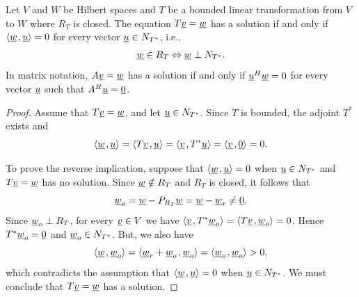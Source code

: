 \begin{theorem}
Let $V$ and $W$ be Hilbert spaces and $T$ be a bounded linear transformation from $V$ to $W$ where $R_T$ is closed.
The equation $T\underline{v} = \underline{w}$ has a solution if and only if ${\left\langle  \underline{w}  \mskip2mu ,  \underline{u}  \right\rangle} = 0$ for every vector $\underline{u} \in N_{T^*}$, i.e.,
\begin{equation*}
\underline{w} \in R_T \Leftrightarrow \underline{w} \perp N_{T^*} .
\end{equation*}
In matrix notation, $A \underline{v} = \underline{w}$ has a solution if and only if $\underline{u}^H \underline{w} = 0$ for every vector $\underline{u}$ such that $A^H \underline{u} = \underline{0}$.
\end{theorem}
\begin{proof}
Assume that $T \underline{v} = \underline{w}$, and let $\underline{u} \in N_{T^*}$.
Since $T$ is bounded, the adjoint $T^*$ exists and
\begin{equation*}
{\left\langle  \underline{w}  \mskip2mu ,  \underline{u}  \right\rangle}
= {\left\langle  T \underline{v}  \mskip2mu ,  \underline{u}  \right\rangle}
= {\left\langle  \underline{v}  \mskip2mu ,  T^* \underline{u}  \right\rangle}
= {\left\langle  \underline{v}  \mskip2mu ,  \underline{0}  \right\rangle}
= 0 .
\end{equation*}

To prove the reverse implication, suppose that ${\left\langle  \underline{w}  \mskip2mu ,  \underline{u}  \right\rangle} = 0$ when $\underline{u} \in N_{T^*}$ and $T \underline{v} = \underline{w}$ has no solution.
Since $\underline{w} \notin R_T$ and $R_T$ is closed, it follows that
\begin{equation*}
\underline{w}_o = \underline{w} - P_{R_T} \underline{w} = \underline{w} - \underline{w}_r
\neq \underline{0}.
\end{equation*}
Since $\underline w_o\perp R_T$, for every $\underline v\in V$ we have ${\left\langle \underline v \mskip2mu , T^*\underline w_o \right\rangle}={\left\langle T\underline v \mskip2mu , \underline w_o \right\rangle}=0$. 
Hence $T^*\underline w_o=\underline0$ and $\underline w_o\in N_{T^*}$.
But, we also have
\begin{equation*}
{\left\langle  \underline{w}  \mskip2mu ,  \underline{w}_o  \right\rangle}
= {\left\langle  \underline{w}_r + \underline{w}_o   \mskip2mu ,  \underline{w}_o  \right\rangle}
= {\left\langle  \underline{w}_o  \mskip2mu ,  \underline{w}_o  \right\rangle}
> 0,
\end{equation*}
which contradicts the assumption that ${\left\langle  \underline{w}  \mskip2mu ,  \underline{u}  \right\rangle} = 0$ when $\underline{u} \in N_{T^*}$.
We must conclude that $T \underline{v} = \underline{w}$ has a solution.
\end{proof}


